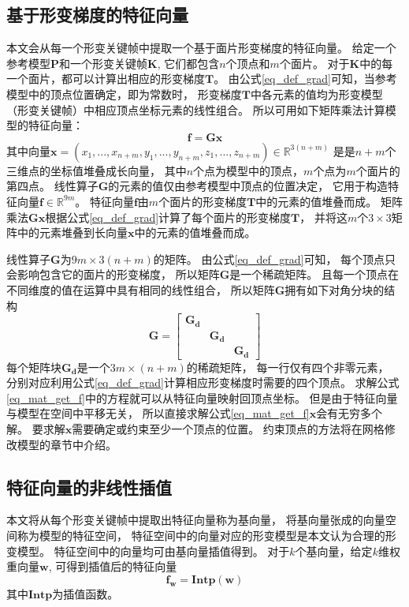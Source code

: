 \subsection{基于形变梯度的特征向量}\label{sec_feature}
本文会从每一个形变关键帧中提取一个基于面片形变梯度的特征向量。
给定一个参考模型$\bm{P}$和一个形变关键帧$\bm{K}$,
它们都包含$n$个顶点和$m$个面片。
对于$\bm{K}$中的每一个面片，都可以计算出相应的形变梯度$\bm{T}$。
由公式\ref{eq_def_grad}可知，当参考模型中的顶点位置确定，即为常数时，
形变梯度$\bm{T}$中各元素的值均为形变模型（形变关键帧）中相应顶点坐标元素的线性组合。
所以可用如下矩阵乘法计算模型的特征向量：
\begin{equation}
    \label{eq_mat_get_f}
    \bm{f}=\bm{G}\bm{x}
\end{equation}
其中向量$\bm{x}=(x_1,...,x_{n+m},y_1,...,y_{n+m},z_1,...,z_{n+m}) \in \mathbb{R}^{3(n+m)}$
是是$n+m$个三维点的坐标值堆叠成长向量，
其中$n$个点为模型中的顶点，$m$个点为$m$个面片的第四点。
线性算子$\bm{G}$的元素的值仅由参考模型中顶点的位置决定，
它用于构造特征向量$\bm{f}\in\mathbb{R}^{9m}$。
特征向量$\bm{f}$由$m$个面片的形变梯度$\bm{T}$中的元素的值堆叠而成。
矩阵乘法$\bm{Gx}$根据公式\ref{eq_def_grad}计算了每个面片的形变梯度$\bm{T}$，
并将这$m$个$3 \times 3$矩阵中的元素堆叠到长向量$\bm{x}$中的元素的值堆叠而成。

线性算子$\bm{G}$为$9m\times 3(n+m)$的矩阵。
由公式\ref{eq_def_grad}可知，
每个顶点只会影响包含它的面片的形变梯度，
所以矩阵$\bm{G}$是一个稀疏矩阵。
且每一个顶点在不同维度的值在运算中具有相同的线性组合，
所以矩阵$\bm{G}$拥有如下对角分块的结构
\begin{equation}
    \bm{G}=
    \begin{bmatrix}
        \bm{G_d} &        & \\ 
         &       \bm{G_d} & \\ 
         &       &        \bm{G_d}
    \end{bmatrix}
\end{equation}
每个矩阵块$\bm{G_d}$是一个$3m \times (n+m)$的稀疏矩阵，
每一行仅有四个非零元素，
分别对应利用公式\ref{eq_def_grad}计算相应形变梯度时需要的四个顶点。
求解公式\ref{eq_mat_get_f}中的方程就可以从特征向量映射回顶点坐标。
但是由于特征向量与模型在空间中平移无关，
所以直接求解公式\ref{eq_mat_get_f}$\bm{x}$会有无穷多个解。
要求解$\bm{x}$需要确定或约束至少一个顶点的位置。
约束顶点的方法将在网格修改模型的章节中介绍。
\subsection{特征向量的非线性插值}
本文将从每个形变关键帧中提取出特征向量称为基向量，
将基向量张成的向量空间称为模型的特征空间，
特征空间中的向量对应的形变模型是本文认为合理的形变模型。
特征空间中的向量均可由基向量插值得到。
对于$k$个基向量，给定$k$维权重向量$\bm{w}$,
可得到插值后的特征向量
\begin{equation}
    \bm{f_w}=\bm{Intp}(\bm{w})
\end{equation}
其中$\bm{Intp}$为插值函数。


